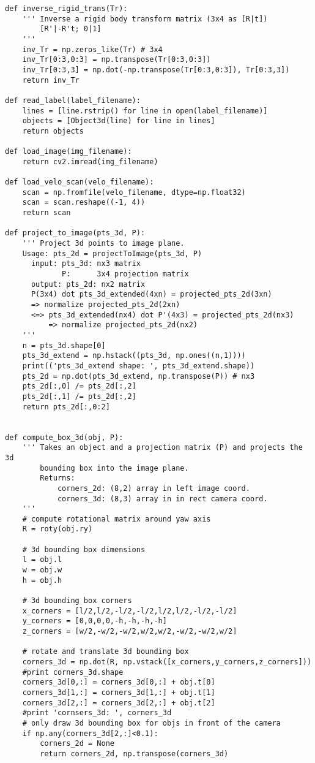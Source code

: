 \begin{verbatim}
def inverse_rigid_trans(Tr):
    ''' Inverse a rigid body transform matrix (3x4 as [R|t])
        [R'|-R't; 0|1]
    '''
    inv_Tr = np.zeros_like(Tr) # 3x4
    inv_Tr[0:3,0:3] = np.transpose(Tr[0:3,0:3])
    inv_Tr[0:3,3] = np.dot(-np.transpose(Tr[0:3,0:3]), Tr[0:3,3])
    return inv_Tr

def read_label(label_filename):
    lines = [line.rstrip() for line in open(label_filename)]
    objects = [Object3d(line) for line in lines]
    return objects

def load_image(img_filename):
    return cv2.imread(img_filename)

def load_velo_scan(velo_filename):
    scan = np.fromfile(velo_filename, dtype=np.float32)
    scan = scan.reshape((-1, 4))
    return scan

def project_to_image(pts_3d, P):
    ''' Project 3d points to image plane.
    Usage: pts_2d = projectToImage(pts_3d, P)
      input: pts_3d: nx3 matrix
             P:      3x4 projection matrix
      output: pts_2d: nx2 matrix
      P(3x4) dot pts_3d_extended(4xn) = projected_pts_2d(3xn)
      => normalize projected_pts_2d(2xn)
      <=> pts_3d_extended(nx4) dot P'(4x3) = projected_pts_2d(nx3)
          => normalize projected_pts_2d(nx2)
    '''
    n = pts_3d.shape[0]
    pts_3d_extend = np.hstack((pts_3d, np.ones((n,1))))
    print(('pts_3d_extend shape: ', pts_3d_extend.shape))
    pts_2d = np.dot(pts_3d_extend, np.transpose(P)) # nx3
    pts_2d[:,0] /= pts_2d[:,2]
    pts_2d[:,1] /= pts_2d[:,2]
    return pts_2d[:,0:2]


def compute_box_3d(obj, P):
    ''' Takes an object and a projection matrix (P) and projects the 3d
        bounding box into the image plane.
        Returns:
            corners_2d: (8,2) array in left image coord.
            corners_3d: (8,3) array in in rect camera coord.
    '''
    # compute rotational matrix around yaw axis
    R = roty(obj.ry)    

    # 3d bounding box dimensions
    l = obj.l
    w = obj.w
    h = obj.h
    
    # 3d bounding box corners
    x_corners = [l/2,l/2,-l/2,-l/2,l/2,l/2,-l/2,-l/2]
    y_corners = [0,0,0,0,-h,-h,-h,-h]
    z_corners = [w/2,-w/2,-w/2,w/2,w/2,-w/2,-w/2,w/2]
    
    # rotate and translate 3d bounding box
    corners_3d = np.dot(R, np.vstack([x_corners,y_corners,z_corners]))
    #print corners_3d.shape
    corners_3d[0,:] = corners_3d[0,:] + obj.t[0]
    corners_3d[1,:] = corners_3d[1,:] + obj.t[1]
    corners_3d[2,:] = corners_3d[2,:] + obj.t[2]
    #print 'cornsers_3d: ', corners_3d 
    # only draw 3d bounding box for objs in front of the camera
    if np.any(corners_3d[2,:]<0.1):
        corners_2d = None
        return corners_2d, np.transpose(corners_3d)
    

\end{verbatim}
